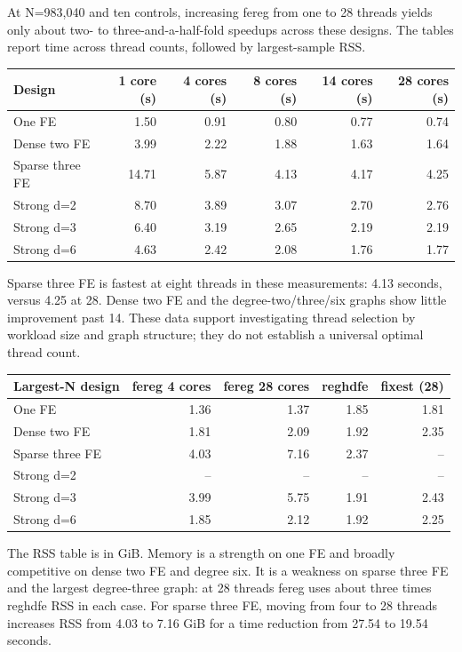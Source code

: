 \documentclass[11pt]{article}
\begin{document}
At N=983,040 and ten controls, increasing fereg from one to 28 threads yields only about two- to three-and-a-half-fold speedups across these designs. The tables report time across thread counts, followed by largest-sample RSS.

\small\begin{longtable}{lrrrrr}
\toprule
Design & 1 core (s) & 4 cores (s) & 8 cores (s) & 14 cores (s) & 28 cores (s)\\\midrule\endhead
One FE & 1.50 & 0.91 & 0.80 & 0.77 & 0.74\\
Dense two FE & 3.99 & 2.22 & 1.88 & 1.63 & 1.64\\
Sparse three FE & 14.71 & 5.87 & 4.13 & 4.17 & 4.25\\
Strong d=2 & 8.70 & 3.89 & 3.07 & 2.70 & 2.76\\
Strong d=3 & 6.40 & 3.19 & 2.65 & 2.19 & 2.19\\
Strong d=6 & 4.63 & 2.42 & 2.08 & 1.76 & 1.77\\
\bottomrule\end{longtable}\normalsize

Sparse three FE is fastest at eight threads in these measurements: 4.13 seconds, versus 4.25 at 28. Dense two FE and the degree-two/three/six graphs show little improvement past 14. These data support investigating thread selection by workload size and graph structure; they do not establish a universal optimal thread count.

\small\begin{longtable}{lrrrr}
\toprule
Largest-N design & fereg 4 cores & fereg 28 cores & reghdfe & fixest (28)\\\midrule\endhead
One FE & 1.36 & 1.37 & 1.85 & 1.81\\
Dense two FE & 1.81 & 2.09 & 1.92 & 2.35\\
Sparse three FE & 4.03 & 7.16 & 2.37 & --\\
Strong d=2 & -- & -- & -- & --\\
Strong d=3 & 3.99 & 5.75 & 1.91 & 2.43\\
Strong d=6 & 1.85 & 2.12 & 1.92 & 2.25\\
\bottomrule\end{longtable}\normalsize

The RSS table is in GiB. Memory is a strength on one FE and broadly competitive on dense two FE and degree six. It is a weakness on sparse three FE and the largest degree-three graph: at 28 threads fereg uses about three times reghdfe RSS in each case. For sparse three FE, moving from four to 28 threads increases RSS from 4.03 to 7.16 GiB for a time reduction from 27.54 to 19.54 seconds.
\end{document}
